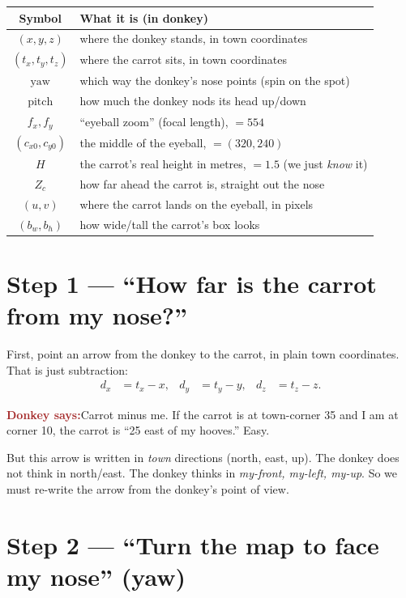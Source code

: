 \documentclass[11pt]{article}
\newcommand{\donkey}[1]{%
  \begin{mdframed}[backgroundcolor=brown!8, linecolor=brown!50, linewidth=1pt,
                   roundcorner=6pt, skipabove=8pt, skipbelow=8pt]
  \textbf{\textcolor{brown}{\large Donkey says:}}\quad #1
  \end{mdframed}}
\begin{document}
\begin{center}
\begin{tabular}{cl}
\hline
Symbol & What it is (in donkey) \\
\hline
$(x,y,z)$ & where the donkey stands, in town coordinates \\
$(t_x,t_y,t_z)$ & where the carrot sits, in town coordinates \\
$\text{yaw}$ & which way the donkey's nose points (spin on the spot) \\
$\text{pitch}$ & how much the donkey nods its head up/down \\
$f_x, f_y$ & ``eyeball zoom'' (focal length), $=554$ \\
$(c_{x0}, c_{y0})$ & the middle of the eyeball, $=(320,240)$ \\
$H$ & the carrot's real height in metres, $=1.5$ (we just \emph{know} it) \\
$Z_c$ & how far ahead the carrot is, straight out the nose \\
$(u,v)$ & where the carrot lands on the eyeball, in pixels \\
$(b_w,b_h)$ & how wide/tall the carrot's box looks \\
\hline
\end{tabular}
\end{center}

\section{Step 1 --- ``How far is the carrot from my nose?''}

First, point an arrow from the donkey to the carrot, in plain town coordinates.
That is just subtraction:
\begin{align}
d_x &= t_x - x, & d_y &= t_y - y, & d_z &= t_z - z.
\end{align}

\donkey{Carrot minus me. If the carrot is at town-corner 35 and I am at
corner 10, the carrot is ``25 east of my hooves.'' Easy.}

But this arrow is written in \emph{town} directions (north, east, up). The donkey
does not think in north/east. The donkey thinks in \emph{my-front, my-left,
my-up}. So we must re-write the arrow from the donkey's point of view.

\section{Step 2 --- ``Turn the map to face my nose'' (yaw)}
\end{document}
